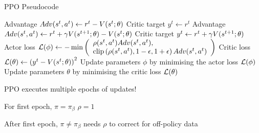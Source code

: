 \begin{frame}[t]{PPO Pseudocode}
{\begin{minipage}{.8 \linewidth}
                    \State Advantage $Adv(s^t, a^t) \gets r^t - V(s^t; \theta)$
                    \State Critic target $y^t \gets r^t$
                \Else
                    \State Advantage $Adv(s^t, a^t) \gets r^t + \gamma V(s^{t+1}; \theta) - V(s^t; \theta)$
                    \State Critic target $y^t \gets r^t + \gamma V(s^{t+1}; \theta)$
                \EndIf
                \State Actor loss $\mathcal{L}(\phi) \gets - \min\left(
                    \begin{array}{ll}
                        \rho(s^t, a^t) Adv(s^t, a^t),\\
                        \text{clip}\left(\rho(s^t, a^t),1 - \epsilon, 1 + \epsilon\right) Adv(s^t, a^t)
                    \end{array}
                \right)$
                \State Critic loss $\mathcal{L}(\theta) \gets \left(y^t - V(s^t; \theta)\right)^2$
                \State Update parameters $\phi$ by minimising the actor loss $\mathcal{L}(\phi)$
                \State Update parameters $\theta$ by minimising the critic loss $\mathcal{L}(\theta)$
            \EndFor
        \EndFor
    \EndFor
\ealg
\end{minipage}}
\hfill
\begin{minipage}{.4\textwidth}
    \blist
        \item PPO executes multiple epochs of updates!
        \item For first epoch, $\pi = \pi_\beta$ \listtab $\rho = 1$
        \item After first epoch, $\pi \neq \pi_\beta$ \listtab needs $\rho$ to correct for off-policy data
    \elist
\end{minipage}
    
\end{frame}


